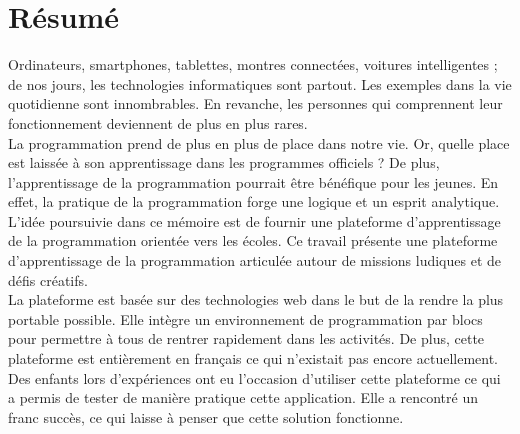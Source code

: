 \section*{Résumé}
Ordinateurs, smartphones, tablettes, montres connectées, voitures intelligentes ; de nos jours, les technologies informatiques sont partout. Les exemples dans la vie quotidienne sont innombrables. En revanche, les personnes qui comprennent leur fonctionnement deviennent de plus en plus rares.\\

La programmation prend de plus en plus de place dans notre vie. Or, quelle place est laissée à son apprentissage dans les programmes officiels ? De plus, l'apprentissage de la programmation pourrait être bénéfique pour les jeunes. En effet, la pratique de la programmation forge une logique et un esprit analytique.\\

L'idée poursuivie dans ce mémoire est de fournir une plateforme d'apprentissage de la programmation orientée vers les écoles. Ce travail présente une plateforme d'apprentissage de la programmation articulée autour de missions ludiques et de défis créatifs.\\

La plateforme est basée sur des technologies web dans le but de la rendre la plus portable possible. Elle intègre un environnement de programmation par blocs pour permettre à tous de rentrer rapidement dans les activités. De plus, cette plateforme est entièrement en français ce qui n'existait pas encore actuellement.\\

Des enfants lors d'expériences ont eu l'occasion d'utiliser cette plateforme ce qui a permis de tester de manière pratique cette application. Elle a rencontré un franc succès, ce qui laisse à penser que cette solution fonctionne.


